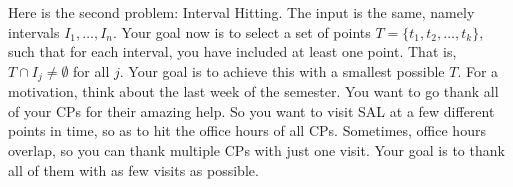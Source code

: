 \documentclass[10pt]{article}
\newcommand{\OPT}[2][]{\ensuremath{\text{OPT}_{#1}(#2)}\xspace}
\begin{document}
  Here is the second problem: Interval Hitting. The input is the same, namely intervals $I_1, \ldots, I_n$. Your goal now is to select a set of points $T = \{t_1, t_2, \ldots, t_k\}$, such that for each interval, you have included at least one point. That is, $T \cap I_j \neq \emptyset$ for all $j$. Your goal is to achieve this with a smallest possible $T$.
  For a motivation, think about the last week of the semester. You want to go thank all of your CPs for their amazing help. So you want to visit SAL at a few different points in time, so as to hit the office hours of all CPs. Sometimes, office hours overlap, so you can thank multiple CPs with just one visit. Your goal is to thank all of them with as few visits as possible.

\end{document}
